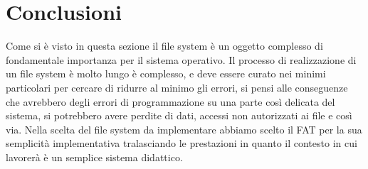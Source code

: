          \section{Conclusioni}
            Come si è visto in questa sezione il file system è un oggetto complesso di fondamentale importanza per il sistema operativo.  Il processo di realizzazione di un file system è molto lungo è complesso, e deve essere curato nei minimi particolari per cercare di ridurre al minimo gli errori, si pensi alle conseguenze che avrebbero degli errori di programmazione su una parte così delicata del sistema, si potrebbero avere  perdite di dati, accessi non autorizzati ai file e così via.
            Nella scelta del file system da implementare abbiamo scelto il FAT per la sua semplicità implementativa tralasciando le prestazioni in quanto il contesto in cui lavorerà è un semplice sistema didattico. 

\clearpage{\pagestyle{empty}\cleardoublepage}

